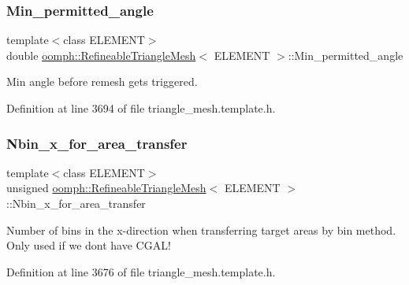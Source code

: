\subsubsection{\texorpdfstring{Min\+\_\+permitted\+\_\+angle}{Min\_permitted\_angle}}
{\footnotesize\ttfamily template$<$class E\+L\+E\+M\+E\+NT$>$ \\
double \hyperlink{classoomph_1_1RefineableTriangleMesh}{oomph\+::\+Refineable\+Triangle\+Mesh}$<$ E\+L\+E\+M\+E\+NT $>$\+::Min\+\_\+permitted\+\_\+angle\hspace{0.3cm}{\ttfamily [protected]}}



Min angle before remesh gets triggered. 



Definition at line 3694 of file triangle\+\_\+mesh.\+template.\+h.

\mbox{\label{classoomph_1_1RefineableTriangleMesh_a3a9e90149a6ccc80f1bccca77f46fb2e}} 
\subsubsection{\texorpdfstring{Nbin\+\_\+x\+\_\+for\+\_\+area\+\_\+transfer}{Nbin\_x\_for\_area\_transfer}}
{\footnotesize\ttfamily template$<$class E\+L\+E\+M\+E\+NT$>$ \\
unsigned \hyperlink{classoomph_1_1RefineableTriangleMesh}{oomph\+::\+Refineable\+Triangle\+Mesh}$<$ E\+L\+E\+M\+E\+NT $>$\+::Nbin\+\_\+x\+\_\+for\+\_\+area\+\_\+transfer\hspace{0.3cm}{\ttfamily [protected]}}



Number of bins in the x-\/direction when transferring target areas by bin method. Only used if we don\textquotesingle{}t have C\+G\+A\+L! 



Definition at line 3676 of file triangle\+\_\+mesh.\+template.\+h.

\mbox{\label{classoomph_1_1RefineableTriangleMesh_af2c7213f1094f8e81e7dbd28b60cff18}} 
